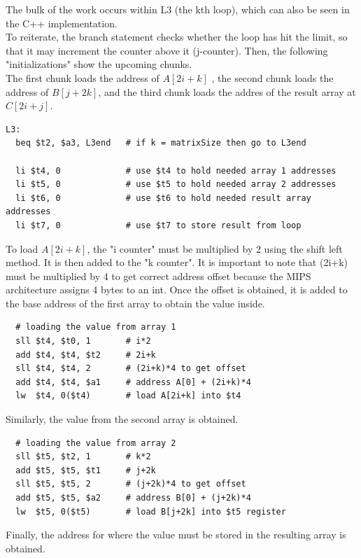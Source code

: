 \documentclass[twocolumn]{article}
\begin{document}
The bulk of the work occurs within L3 (the kth loop), which can also be seen in the C++ implementation. \\

To reiterate, the branch statement checks whether the loop has hit the limit, so that it may increment the counter above it (j-counter). Then, the following "initializations" show the upcoming chunks.\\

The first chunk loads the address of $A[2i+k]$ , the second chunk loads the address of $B[j+2k]$, and the third chunk loads the addres of the result array at $C[2i+j]$.

\begin{verbatim}
L3:
  beq $t2, $a3, L3end   # if k = matrixSize then go to L3end

  li $t4, 0  		    # use $t4 to hold needed array 1 addresses
  li $t5, 0   		    # use $t5 to hold needed array 2 addresses
  li $t6, 0   		    # use $t6 to hold needed result array addresses
  li $t7, 0   		    # use $t7 to store result from loop
\end{verbatim}

To load $A[2i+k]$, the "i counter" must be multiplied by 2 using the shift left method. It is then added to the "k counter". It is important to note that (2i+k) must be multiplied by 4 to get correct address offset because the MIPS architecture assigns 4 bytes to an int. Once the offset is obtained, it is added to the base address of the first array to obtain the value inside. 

\begin{verbatim}
  # loading the value from array 1
  sll $t4, $t0, 1       # i*2
  add $t4, $t4, $t2     # 2i+k
  sll $t4, $t4, 2       # (2i+k)*4 to get offset
  add $t4, $t4, $a1     # address A[0] + (2i+k)*4
  lw  $t4, 0($t4)       # load A[2i+k] into $t4 
\end{verbatim}

Similarly, the value from the second array is obtained. 

\begin{verbatim}
  # loading the value from array 2
  sll $t5, $t2, 1       # k*2
  add $t5, $t5, $t1     # j+2k
  sll $t5, $t5, 2       # (j+2k)*4 to get offset
  add $t5, $t5, $a2     # address B[0] + (j+2k)*4
  lw  $t5, 0($t5)       # load B[j+2k] into $t5 register
\end{verbatim}

Finally, the address for where the value must be stored in the resulting array is obtained. 
\end{document}
